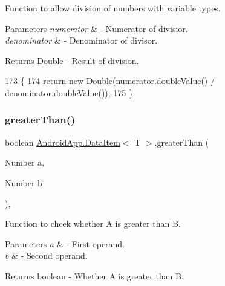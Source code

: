 Function to allow division of numbers with variable types. 


\begin{DoxyParams}{Parameters}
{\em numerator} & -\/ Numerator of divisior. \\
\hline
{\em denominator} & -\/ Denominator of divisor. \\
\hline
\end{DoxyParams}
\begin{DoxyReturn}{Returns}
Double -\/ Result of division. 
\end{DoxyReturn}

\begin{DoxyCode}
173                                                                 \{
174         \textcolor{keywordflow}{return} \textcolor{keyword}{new} Double(numerator.doubleValue() / denominator.doubleValue());
175     \}
\end{DoxyCode}
\mbox{\label{class_android_app_1_1_data_item_ab7fc2c1c68ba314ce4131e3e761aef2e}} 
\subsubsection{\texorpdfstring{greater\+Than()}{greaterThan()}}
{\footnotesize\ttfamily boolean \hyperlink{class_android_app_1_1_data_item}{Android\+App.\+Data\+Item}$<$ T $>$.greater\+Than (\begin{DoxyParamCaption}\item[{Number}]{a,  }\item[{Number}]{b }\end{DoxyParamCaption})\hspace{0.3cm}{\ttfamily [inline]}, {\ttfamily [private]}}



Function to chcek whether A is greater than B. 


\begin{DoxyParams}{Parameters}
{\em a} & -\/ First operand. \\
\hline
{\em b} & -\/ Second operand. \\
\hline
\end{DoxyParams}
\begin{DoxyReturn}{Returns}
boolean -\/ Whether A is greater than B. 
\end{DoxyReturn}

